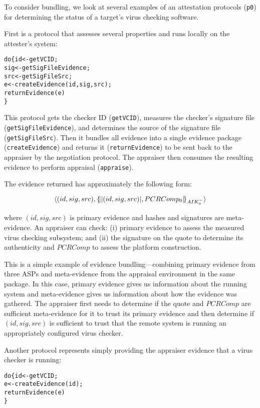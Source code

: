\documentclass[10pt]{article}
\begin{document}
To consider bundling, we look at several examples of an attestation
protocols (\Verb+p0+) for determining the status of a target's virus
checking software.

First is a protocol that assesses several properties and runs locally
on the attester's system:

\begin{alltt}
  do \{ id <- getVCID;
       sig <- getSigFileEvidence;
       src <- getSigFileSrc;
       e <- createEvidence(id,sig,src);
       returnEvidence(e)
  \}
\end{alltt}

This protocol gets the checker ID (\Verb+getVCID+), measures the
checker's signature file (\Verb+getSigFileEvidence+), and determines
the source of the signature file (\Verb+getSigFileSrc+). Then it
bundles all evidence into a single evidence package
(\Verb+createEvidence+) and returns it (\Verb+returnEvidence+) to be
sent back to the appraiser by the negotiation protocol.  The appraiser
then consumes the resulting evidence to perform appraisal
(\Verb+appraise+).

The evidence returned has approximately the following form:

\[\langle (id,sig,src),\{\!\lvert \lvert (id,sig,src) \rvert,PCRComp_0\rvert\!\}_{AIK_0^{-}}\rangle\]

where $(id,sig,src)$ is primary evidence and hashes and signatures are
meta-evidence.  An appraiser can check: (i) primary evidence to assess
the measured virus checking subsystem; and (ii) the signature on the
quote to determine its authenticity and $PCRComp$ to assess the
platform construction.

This is a simple example of evidence bundling---combining primary
evidence from three ASPs and meta-evidence from the appraisal
environment in the same package.  In this case, primary evidence gives
us information about the running system and meta-evidence gives us
information about how the evidence was gathered.  The appraiser first
needs to determine if the quote and $PCRComp$ are sufficient
meta-evidence for it to trust its primary evidence and then determine
if $(id,sig,src)$ is sufficient to trust that the remote system is
running an appropriately configured virus checker.

Another protocol represents simply providing the appraiser evidence
that a virus checker is running:

\begin{alltt}
  do \{ id <- getVCID;
       e <- createEvidence(id);
       returnEvidence(e)
  \}
\end{alltt}
\end{document}
